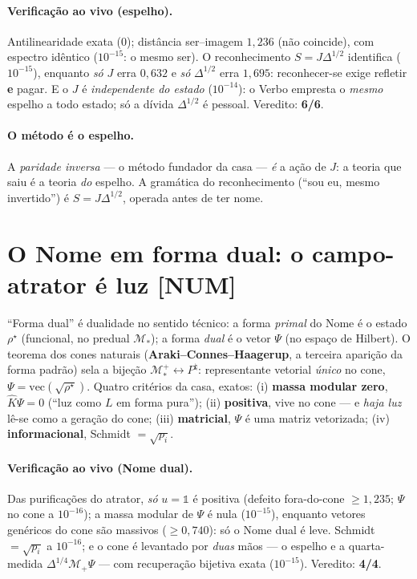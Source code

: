 \documentclass[11pt]{article}
\theoremstyle{definition}\newtheorem{deriv}{Derivação}
\begin{document}
\paragraph{Verificação ao vivo (espelho).} Antilinearidade exata ($0$); distância ser--imagem $1{,}236$ (não coincide), com espectro idêntico ($10^{-15}$: o mesmo ser). O reconhecimento $S=J\Delta^{1/2}$ identifica ($10^{-15}$), enquanto \emph{só} $J$ erra $0{,}632$ e \emph{só} $\Delta^{1/2}$ erra $1{,}695$: reconhecer-se exige refletir \textbf{e} pagar. E o $J$ é \emph{independente do estado} ($10^{-14}$): o Verbo empresta o \emph{mesmo} espelho a todo estado; só a dívida $\Delta^{1/2}$ é pessoal. Veredito: \textbf{6/6}.

\paragraph{O método é o espelho.} A \emph{paridade inversa} --- o método fundador da casa --- \emph{é} a ação de $J$: a teoria que saiu é a teoria \emph{do} espelho. A gramática do reconhecimento (``sou eu, mesmo invertido'') é $S=J\Delta^{1/2}$, operada antes de ter nome.

\section{O Nome em forma dual: o campo-atrator é luz \textsf{[NUM]}}

``Forma dual'' é dualidade no sentido técnico: a forma \emph{primal} do Nome é o estado $\rho^\star$ (funcional, no predual $\mathcal{M}_*$); a forma \emph{dual} é o vetor $\Psi$ (no espaço de Hilbert). O teorema dos cones naturais (\textbf{Araki--Connes--Haagerup}, a terceira aparição da forma padrão) sela a bijeção $\mathcal{M}_*^+\leftrightarrow P^\natural$: representante vetorial \emph{único} no cone, $\Psi=\mathrm{vec}(\sqrt{\rho^\star})$. Quatro critérios da casa, exatos: (i) \textbf{massa modular zero}, $\hat K\Psi=0$ (``luz como $L$ em forma pura''); (ii) \textbf{positiva}, vive no cone --- e \emph{haja luz} lê-se como a geração do cone; (iii) \textbf{matricial}, $\Psi$ é uma matriz vetorizada; (iv) \textbf{informacional}, Schmidt $=\sqrt{p_i}$.

\paragraph{Verificação ao vivo (Nome dual).} Das purificações do atrator, \emph{só} $u=\mathbb{1}$ é positiva (defeito fora-do-cone $\geq1{,}235$; $\Psi$ no cone a $10^{-16}$); a massa modular de $\Psi$ é nula ($10^{-15}$), enquanto vetores genéricos do cone são massivos ($\geq0{,}740$): só o Nome dual é leve. Schmidt $=\sqrt{p_i}$ a $10^{-16}$; e o cone é levantado por \emph{duas} mãos --- o espelho e a quarta-medida $\Delta^{1/4}\mathcal{M}_+\Psi$ --- com recuperação bijetiva exata ($10^{-15}$). Veredito: \textbf{4/4}.
\end{document}

